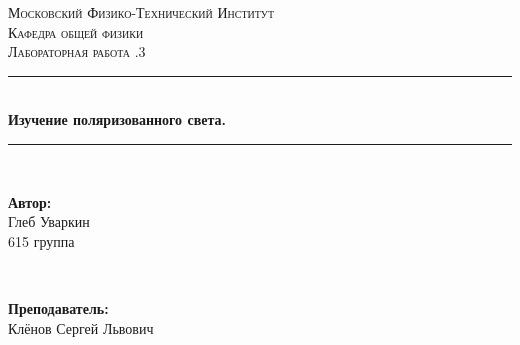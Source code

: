 \documentclass[a4paper, 12pt, twoside]{article}
\begin{document}
	\begin{titlepage}
		
		\newcommand{\HRule}{\rule{\linewidth}{0.7mm}} %
		
		\center %
		
		
		\textsc{\LARGE Московский Физико-Технический Институт}\\[1,5cm] %
		\textsc{\Large Кафедра общей физики}\\[0.5cm] %
		\textsc{\large Лабораторная работа .3}\\[0.5cm] %
		
		
		\HRule
		\\[0.4cm]
		{ \huge \bfseries Изучение поляризованного света.}
		\\[0.2cm] %
		\HRule
		\\[1.5cm]
		
		
		
		
		\begin{minipage}{0.4\textwidth}
			\begin{flushleft} \large
				\textbf{Автор:}\\
				Глеб Уваркин \\
				615 группа
			\end{flushleft}
		\end{minipage}
		~
		\begin{minipage}{0.4\textwidth}
			\begin{flushright} \large
				\textbf {Преподаватель:} \\
				Клёнов Сергей Львович %
			\end{flushright}
		\end{minipage}
		

\end{titlepage}
\end{document}
